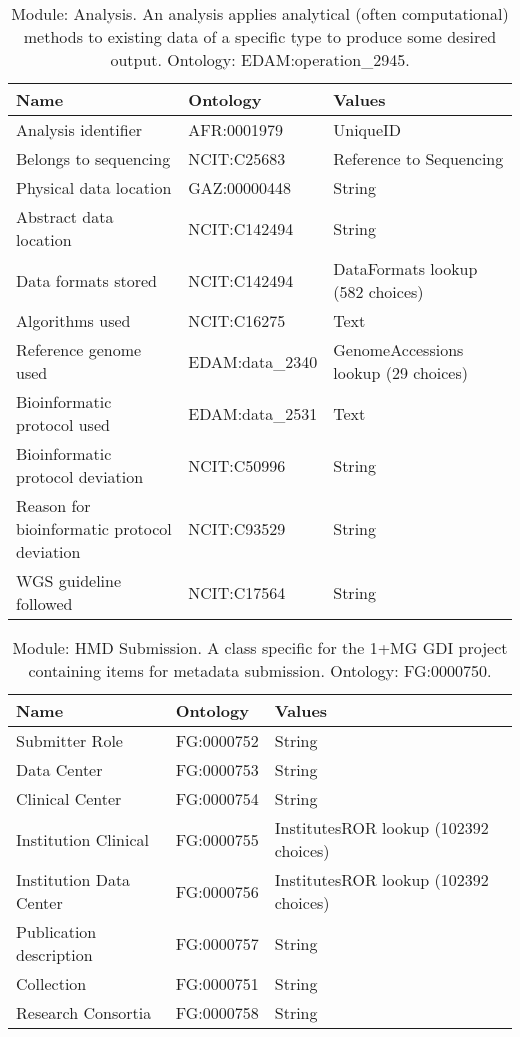 \documentclass{article}
\begin{document}
\begin{table}[htb]
\begin{tabular}{lll}
Name & Ontology & Values \\
\hline
Analysis identifier & AFR:0001979 & UniqueID \\
Belongs to sequencing & NCIT:C25683 & Reference to Sequencing \\
Physical data location & GAZ:00000448 & String \\
Abstract data location & NCIT:C142494 & String \\
Data formats stored & NCIT:C142494 & DataFormats lookup (582 choices) \\
Algorithms used & NCIT:C16275 & Text \\
Reference genome used & EDAM:data\_2340 & GenomeAccessions lookup (29 choices) \\
Bioinformatic protocol used & EDAM:data\_2531 & Text \\
Bioinformatic protocol deviation & NCIT:C50996 & String \\
Reason for bioinformatic protocol deviation & NCIT:C93529 & String \\
WGS guideline followed & NCIT:C17564 & String \\
\hline
\end{tabular}
\caption[Module: Analysis]{\label{table:table10} Module: Analysis. An analysis applies analytical (often computational) methods to existing data of a specific type to produce some desired output. Ontology: EDAM:operation\_2945. }
\end{table}

\begin{table}[htb]
\begin{tabular}{lll}
Name & Ontology & Values \\
\hline
Submitter Role & FG:0000752 & String \\
Data Center & FG:0000753 & String \\
Clinical Center & FG:0000754 & String \\
Institution Clinical & FG:0000755 & InstitutesROR lookup (102392 choices) \\
Institution Data Center & FG:0000756 & InstitutesROR lookup (102392 choices) \\
Publication description & FG:0000757 & String \\
Collection & FG:0000751 & String \\
Research Consortia & FG:0000758 & String \\
\hline
\end{tabular}
\caption[Module: HMD Submission]{\label{table:table11} Module: HMD Submission. A class specific for the 1+MG GDI project containing items for metadata submission. Ontology: FG:0000750. }
\end{table}
\end{document}
